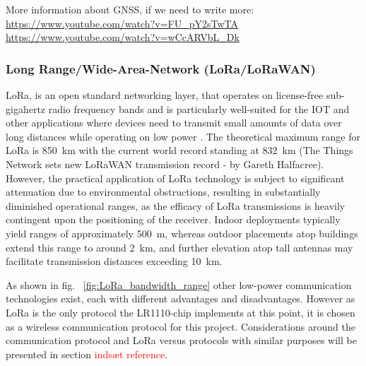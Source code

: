 More information about \ac{GNSS}, if we need to write more:
\url{https://www.youtube.com/watch?v=FU_pY2sTwTA}
\url{https://www.youtube.com/watch?v=wCcARVbL_Dk}


\subsubsection{Long Range/Wide-Area-Network (LoRa/LoRaWAN)}
\ac{LoRa}, is an open standard networking layer, that operates on license-free sub-gigahertz radio frequency bands and is particularly well-suited for the \ac{IOT} and other applications where devices need to transmit small amounts of data over long distances while operating on low power \cite{LoRaWAN_1_0}.
The theoretical maximum range for LoRa is \SI{850}{\kilo\meter} with the current world record standing at \SI{832}{\kilo\meter} (The Things Network sets new \ac{LoRaWAN} transmission record - by Gareth Halfacree).
However, the practical application of \ac{LoRa} technology is subject to significant attenuation due to environmental obstructions, resulting in substantially diminished operational ranges, as the efficacy of \ac{LoRa} transmissions is heavily contingent upon the positioning of the receiver. Indoor deployments typically yield ranges of approximately \SI{500}{\meter}, whereas outdoor placements atop buildings extend this range to around \SI{2}{\kilo\meter}, and further elevation atop tall antennas may facilitate transmission distances exceeding \SI{10}{\kilo\meter}.

As shown in fig.~ \ref{fig:LoRa_bandwidth_range} other low-power communication technologies exist, each with different advantages and disadvantages. However as \ac{LoRa} is the only protocol the LR1110-chip implements at this point, it is chosen as a wireless communication protocol for this project.
Considerations around the communication protocol and \ac{LoRa} versus protocols with similar purposes will be presented in section \textcolor{red}{indsæt reference}.

